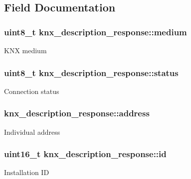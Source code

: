 \subsection{Field Documentation}
\subsubsection[{\texorpdfstring{medium}{medium}}]{\setlength{\rightskip}{0pt plus 5cm}uint8\+\_\+t knx\+\_\+description\+\_\+response\+::medium}\hypertarget{structknx__description__response_a3a9e9c6e0c5d3cc57f97e971abfb0821}{}\label{structknx__description__response_a3a9e9c6e0c5d3cc57f97e971abfb0821}
K\+NX medium 
\subsubsection[{\texorpdfstring{status}{status}}]{\setlength{\rightskip}{0pt plus 5cm}uint8\+\_\+t knx\+\_\+description\+\_\+response\+::status}\hypertarget{structknx__description__response_acc6946b251718d1d4f7194ea7c8dd6f2}{}\label{structknx__description__response_acc6946b251718d1d4f7194ea7c8dd6f2}
Connection status 
\subsubsection[{\texorpdfstring{address}{address}}]{ knx\+\_\+description\+\_\+response\+::address}\hypertarget{structknx__description__response_a43e5129c5778de2c6be48175a8d5557b}{}\label{structknx__description__response_a43e5129c5778de2c6be48175a8d5557b}
Individual address 
\subsubsection[{\texorpdfstring{id}{id}}]{\setlength{\rightskip}{0pt plus 5cm}uint16\+\_\+t knx\+\_\+description\+\_\+response\+::id}\hypertarget{structknx__description__response_a03e19f72ab56858f9be135caf94a11bd}{}\label{structknx__description__response_a03e19f72ab56858f9be135caf94a11bd}
Installation ID 

